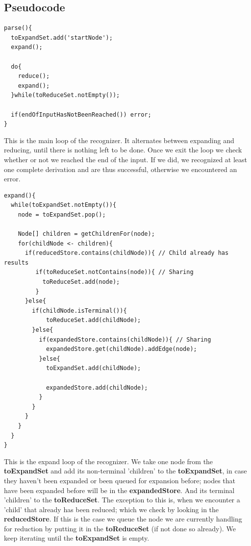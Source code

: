 \documentclass[a4paper,10pt]{article}
\begin{document}
\subsection{Pseudocode}

{\small
\begin{verbatim}
parse(){
  toExpandSet.add('startNode');
  expand();
  
  do{
    reduce();
    expand();
  }while(toReduceSet.notEmpty());
  
  if(endOfInputHasNotBeenReached()) error;
}
\end{verbatim}
}

This is the main loop of the recognizer. It alternates between expanding and reducing, until there is nothing left to be done. Once we exit the loop we check whether or not we reached the end of the input. If we did, we recognized at least one complete derivation and are thus successful, otherwise we encountered an error.

{\small
\begin{verbatim}
expand(){
  while(toExpandSet.notEmpty()){
    node = toExpandSet.pop();
    
    Node[] children = getChildrenFor(node);
    for(childNode <- children){
      if(reducedStore.contains(childNode)){ // Child already has results
         if(toReduceSet.notContains(node)){ // Sharing
           toReduceSet.add(node);
         }
      }else{
        if(childNode.isTerminal()){
            toReduceSet.add(childNode);
        }else{
          if(expandedStore.contains(childNode)){ // Sharing
            expandedStore.get(childNode).addEdge(node);
          }else{
            toExpandSet.add(childNode);
            
            expandedStore.add(childNode);
          }
        }
      }
    }
  }
}
\end{verbatim}
}

This is the expand loop of the recognizer. We take one node from the {\bf toExpandSet} and add its non-terminal 'children' to the {\bf toExpandSet}, in case they haven't been expanded or been queued for expansion before; nodes that have been expanded before will be in the {\bf expandedStore}. And its terminal 'children' to the {\bf toReduceSet}. The exception to this is, when we encounter a 'child' that already has been reduced; which we check by looking in the {\bf reducedStore}. If this is the case we queue the node we are currently handling for reduction by putting it in the {\bf toReduceSet} (if not done so already). We keep iterating until the {\bf toExpandSet} is empty.
\end{document}
